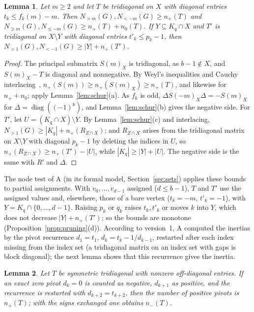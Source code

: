 \documentclass[11pt]{article}
\newtheorem{lemma}{Lemma}[section]
\theoremstyle{definition}
\theoremstyle{remark}
\DeclareMathOperator{\diag}{diag}
\begin{document}
\begin{lemma}\label{lem:prune}
Let $m\ge2$ and let $T$ be tridiagonal on $X$ with diagonal entries
$t_k\le f_k(m)-m$. Then $N_{>m}(G),N_{<-m}(G)\ge n_+(T)$ and
$N_{\ge m}(G),N_{\le-m}(G)\ge n_+(T)+n_0(T)$. If $Y\subseteq K_q\cap X$ and $T'$
is tridiagonal on $X\setminus Y$ with diagonal entries $t'_k\le p_k-1$, then
$N_{>1}(G),N_{<-1}(G)\ge|Y|+n_+(T')$.
\end{lemma}

\begin{proof}
The principal submatrix $S(m)_X$ is tridiagonal, as $b-1\notin X$, and
$S(m)_X-T$ is diagonal and nonnegative. By Weyl's inequalities and Cauchy
interlacing~\cite{bh}, $n_+(S(m))\ge n_+(S(m)_X)\ge n_+(T)$, and likewise for
$n_++n_0$; apply Lemma~\ref{lem:schur}(a). As $f_k$ is odd, $\Delta
S(-m)_X\Delta=-S(m)_X$ for $\Delta=\diag((-1)^k)$, and Lemma~\ref{lem:schur}(b)
gives the negative side. For $T'$, let $U=(K_q\cap X)\setminus Y$. By
Lemma~\ref{lem:schur}(c) and interlacing, $N_{>1}(G)\ge|K_q|+n_+(R_{Z\cap X})$;
and $R_{Z\cap X}$ arises from the tridiagonal matrix on $X\setminus Y$ with
diagonal $p_k-1$ by deleting the indices in $U$, so
$n_+(R_{Z\cap X})\ge n_+(T')-|U|$, while $|K_q|\ge|Y|+|U|$. The negative side
is the same with $R'$ and $\Delta$.
\end{proof}


The node test of A (in its formal model, Section~\ref{sec:sets}) applies these
bounds to partial assignments. With $v_0,\dots,v_{d-1}$ assigned ($d\le b-1$), $T$ and $T'$ use the assigned
values and, elsewhere, those of a bare vertex ($t_k=-m$, $t'_k=-1$), with
$Y=K_q\cap\{0,\dots,d-1\}$. Raising $p_k$ or $q_k$ raises $t_k,t'_k$ or moves
$k$ into $Y$, which does not decrease $|Y|+n_+(T')$; so the bounds are
monotone (Proposition~\ref{prop:pruning}(d)). According to version~1, A
computed the inertias by the pivot recurrence $d_1=t_1$,
$d_k=t_k-1/d_{k-1}$, restarted after each index missing from the index set (a
tridiagonal matrix on an index set with gaps is block diagonal); the next
lemma shows that this recurrence gives the inertia.

\begin{lemma}\label{lem:pivot}
Let $T$ be symmetric tridiagonal with nonzero off-diagonal entries. If an exact
zero pivot $d_k=0$ is counted as negative, $d_{k+1}$ as positive, and the
recurrence is restarted with $d_{k+2}=t_{k+2}$, then the number of positive
pivots is $n_+(T)$; with the signs exchanged one obtains $n_-(T)$.
\end{lemma}
\end{document}
